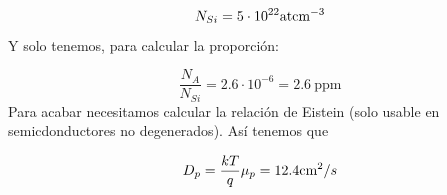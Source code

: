 \begin{texercise}
\begin{enumerate}[label=\alph*)]
		      \begin{equation}
			      N_{Si} = 5 \cdot 10^{22} \text{at} \text{cm}^{-3}
		      \end{equation}
		      Y solo tenemos, para calcular la proporción:

		      \begin{equation}
			      \frac{N_A}{N_{Si}} = 2.6 \cdot 10^{-6} = 2.6 \ \text{ppm}
		      \end{equation}
		      Para acabar necesitamos calcular la relación de Eistein (solo usable en semicdonductores no degenerados). Así tenemos que

		      \begin{equation}
			      D_p = \frac{kT}{q} \mu_p = 12.4 \text{cm}^2 / s
		      \end{equation}
	\end{enumerate}

\end{texercise}


